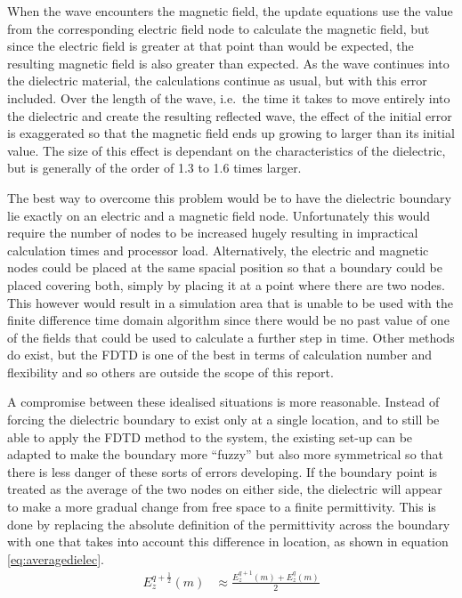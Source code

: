 When the wave encounters the magnetic field, the update equations use the value from the corresponding electric field node to calculate the magnetic field, but since the electric field is greater at that point than would be expected, the resulting magnetic field is also greater than expected. As the wave continues into the dielectric material, the calculations continue as usual, but with this error included. Over the length of the wave, i.e.\ the time it takes to move entirely into the dielectric and create the resulting reflected wave, the effect of the initial error is exaggerated so that the magnetic field ends up growing to larger than its initial value. The size of this effect is dependant on the characteristics of the dielectric, but is generally of the order of 1.3 to 1.6 times larger.

The best way to overcome this problem would be to have the dielectric boundary lie exactly on an electric and a magnetic field node. Unfortunately this would require the number of nodes to be increased hugely resulting in impractical calculation times and processor load. Alternatively, the electric and magnetic nodes could be placed at the same spacial position so that a boundary could be placed covering both, simply by placing it at a point where there are two nodes. This however would result in a simulation area that is unable to be used with the finite difference time domain algorithm since there would be no past value of one of the fields that could be used to calculate a further step in time. Other methods do exist, but the FDTD is one of the best in terms of calculation number and flexibility and so others are outside the scope of this report.

A compromise between these idealised situations is more reasonable. Instead of forcing the dielectric boundary to exist only at a single location, and to still be able to apply the FDTD method to the system, the existing set-up can be adapted to make the boundary more ``fuzzy'' but also more symmetrical so that there is less danger of these sorts of errors developing. If the boundary point is treated as the average of the two nodes on either side, the dielectric will appear to make a more gradual change from free space to a finite permittivity. This is done by replacing the absolute definition of the permittivity across the boundary with one that takes into account this difference in location, as shown in equation \ref{eq:averagedielec}.
\begin{align}
	E^{q+\frac{1}{2}}_z(m) &\approx \frac{E^{q+1}_z(m)+E^q_z(m)}{2} \label{eq:averagedielec}
\end{align}


